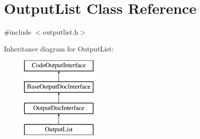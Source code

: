 \hypertarget{class_output_list}{}\section{Output\+List Class Reference}
\label{class_output_list}


{\ttfamily \#include $<$outputlist.\+h$>$}

Inheritance diagram for Output\+List\+:\begin{figure}[H]
\begin{center}
\leavevmode
\includegraphics[height=4.000000cm]{class_output_list}
\end{center}
\end{figure}
